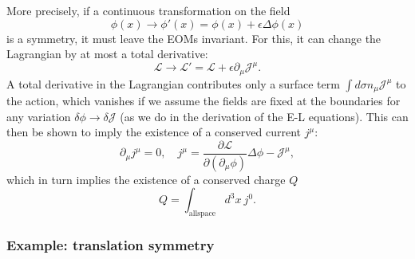 More precisely, if a continuous transformation on the field
\begin{equation}
	\label{eq:01_qft_symmetries_transformation}
	\phi(x) \rightarrow \phi'(x) = \phi(x) + \epsilon\Delta\phi(x)
\end{equation}
is a symmetry, it must leave the EOMs invariant.
For this, it can change the Lagrangian by at most a total derivative:
\begin{equation}
	\label{eq:01_qft_symmetries_lagrangian}
	\mathcal{L} \rightarrow \mathcal{L}' = \mathcal{L} + \epsilon\partial_\mu \mathcal J^\mu.
\end{equation}
A total derivative in the Lagrangian contributes only a surface term $\int d\sigma n_\mu \mathcal J^\mu$ to the action, which vanishes if we assume the fields are fixed at the boundaries for any variation $\delta\phi \rightarrow \delta \mathcal J$ (as we do in the derivation of the E-L equations).
This can then be shown to imply the existence of a conserved current $j^\mu$:
\begin{equation}
	\label{eq:01_qft_symmetries_current}
	\partial_\mu j^\mu = 0, \quad j^\mu = \frac{\partial\mathcal L}{\partial(\partial_\mu\phi)}\Delta\phi - \mathcal J^\mu,
\end{equation}
which in turn implies the existence of a conserved charge $Q$
\begin{equation}
	\label{eq:01_qft_symmetries_charge}
	Q = \int_{\mathrm{all space}} d^3x\ j^0.
\end{equation}

\subsubsection{Example: translation symmetry}

